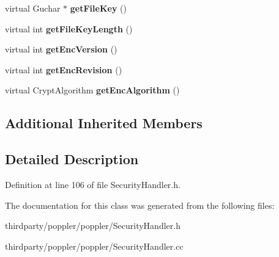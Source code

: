 \begin{DoxyCompactItemize}
\mbox{\label{class_standard_security_handler_a2eaf8220b749dd933c06406cec83e23b}} 
virtual Guchar $\ast$ {\bfseries get\+File\+Key} ()
\item 
\mbox{\label{class_standard_security_handler_a66710b67e16c660ebd77d54ba1587e19}} 
virtual int {\bfseries get\+File\+Key\+Length} ()
\item 
\mbox{\label{class_standard_security_handler_a6cd8492c68fa581cc8a09664a08ccd6a}} 
virtual int {\bfseries get\+Enc\+Version} ()
\item 
\mbox{\label{class_standard_security_handler_a2bf5cef0a926504fc11701ea75926f32}} 
virtual int {\bfseries get\+Enc\+Revision} ()
\item 
\mbox{\label{class_standard_security_handler_abb323b7fcba3a84d7bddc5902aa69acb}} 
virtual Crypt\+Algorithm {\bfseries get\+Enc\+Algorithm} ()
\end{DoxyCompactItemize}
\subsection*{Additional Inherited Members}


\subsection{Detailed Description}


Definition at line 106 of file Security\+Handler.\+h.



The documentation for this class was generated from the following files\+:\begin{DoxyCompactItemize}
\item 
thirdparty/poppler/poppler/Security\+Handler.\+h\item 
thirdparty/poppler/poppler/Security\+Handler.\+cc\end{DoxyCompactItemize}
